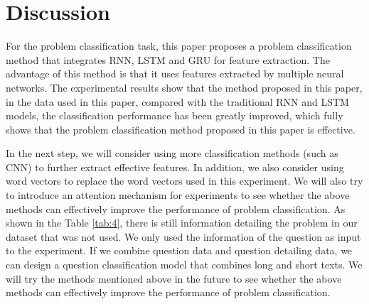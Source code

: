 \documentclass{article}
\begin{document}
\section{Discussion}
For the problem classification task, this paper proposes a problem classification method that integrates RNN, LSTM and GRU for feature extraction. The advantage of this method is that it uses features extracted by multiple neural networks. The experimental results show that the method proposed in this paper, in the data used in this paper, compared with the traditional RNN and LSTM models, the classification performance has been greatly improved, which fully shows that the problem classification method proposed in this paper is effective. 

In the next step, we will consider using more classification methods (such as CNN) to further extract effective features. In addition, we also consider using word vectors to replace the word vectors used in this experiment. We will also try to introduce an attention mechanism for experiments to see whether the above methods can effectively improve the performance of problem classification. As shown in the Table \ref{tab:4}, there is still information detailing the problem in our dataset that was not used. We only used the information of the question as input to the experiment. If we combine question data and question detailing data, we can design a question classification model that combines long and short texts. We will try the methods mentioned above in the future to see whether the above methods can effectively improve the performance of problem classification.



\printbibliography
\end{document}
